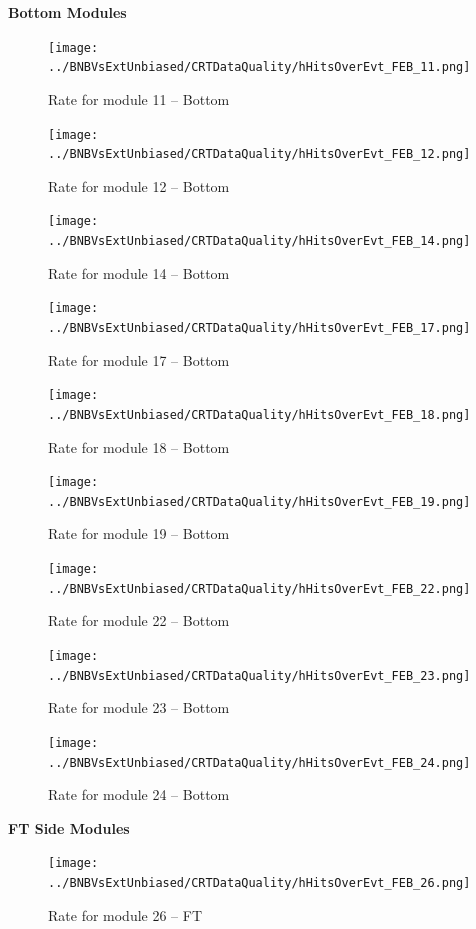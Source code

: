 \clearpage

{\bf Bottom Modules}
\begin{figure}[h!]
\centering
\texttt{[image: ../BNBVsExtUnbiased/CRTDataQuality/hHitsOverEvt\_FEB\_11.png]}
\caption{Rate for module 11 -- Bottom}
\label{Annual11}
\end{figure}
\begin{figure}[h!]
\centering
\texttt{[image: ../BNBVsExtUnbiased/CRTDataQuality/hHitsOverEvt\_FEB\_12.png]}
\caption{Rate for module 12 -- Bottom}
\label{Annual12}
\end{figure}
\begin{figure}[h!]
\centering
\texttt{[image: ../BNBVsExtUnbiased/CRTDataQuality/hHitsOverEvt\_FEB\_14.png]}
\caption{Rate for module 14 -- Bottom}
\label{Annual14}
\end{figure}
\begin{figure}[h!]
\centering
\texttt{[image: ../BNBVsExtUnbiased/CRTDataQuality/hHitsOverEvt\_FEB\_17.png]}
\caption{Rate for module 17 -- Bottom}
\label{Annual17}
\end{figure}
\begin{figure}[h!]
\centering
\texttt{[image: ../BNBVsExtUnbiased/CRTDataQuality/hHitsOverEvt\_FEB\_18.png]}
\caption{Rate for module 18 -- Bottom}
\label{Annual18}
\end{figure}
\begin{figure}[h!]
\centering
\texttt{[image: ../BNBVsExtUnbiased/CRTDataQuality/hHitsOverEvt\_FEB\_19.png]}
\caption{Rate for module 19 -- Bottom}
\label{Annual19}
\end{figure}
\begin{figure}[h!]
\centering
\texttt{[image: ../BNBVsExtUnbiased/CRTDataQuality/hHitsOverEvt\_FEB\_22.png]}
\caption{Rate for module 22 -- Bottom}
\label{Annual22}
\end{figure}
\begin{figure}[h!]
\centering
\texttt{[image: ../BNBVsExtUnbiased/CRTDataQuality/hHitsOverEvt\_FEB\_23.png]}
\caption{Rate for module 23 -- Bottom}
\label{Annual23}
\end{figure}
\begin{figure}[h!]
\centering
\texttt{[image: ../BNBVsExtUnbiased/CRTDataQuality/hHitsOverEvt\_FEB\_24.png]}
\caption{Rate for module 24 -- Bottom}
\label{Annual24}
\end{figure}
\clearpage
{\bf FT Side Modules} 
\begin{figure}[h!]
\centering
\texttt{[image: ../BNBVsExtUnbiased/CRTDataQuality/hHitsOverEvt\_FEB\_26.png]}
\caption{Rate for module 26 -- FT}
\label{Annual26}
\end{figure}
